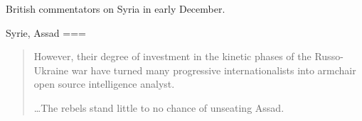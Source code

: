 British commentators on Syria in early December.

Syrie, Assad
===
\begin{quote}
    However, their degree of investment in the kinetic phases of the Russo-Ukraine war have turned many progressive internationalists into armchair open source intelligence analyst.

    …The rebels stand little to no chance of unseating Assad.
\end{quote}
\nocite{bayliss2024}